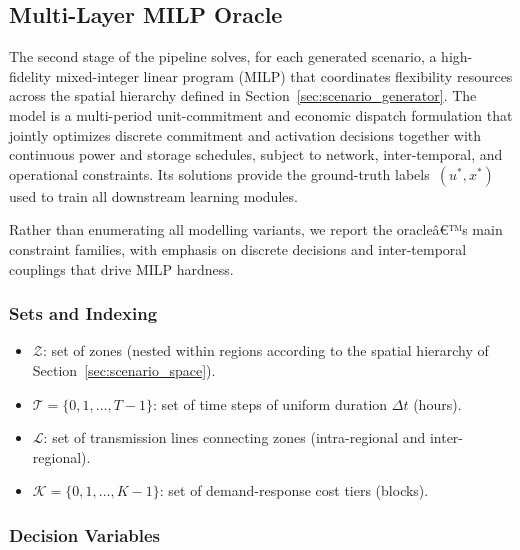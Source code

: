 \documentclass{article}
\begin{document}

\subsection{Multi-Layer MILP Oracle}
\label{sec:milp_oracle}

The second stage of the pipeline solves, for each generated scenario, a high-fidelity mixed-integer linear program (MILP) that coordinates flexibility resources across the spatial hierarchy defined in Section~\ref{sec:scenario_generator}. The model is a multi-period unit-commitment and economic dispatch formulation that jointly optimizes discrete commitment and activation decisions together with continuous power and storage schedules, subject to network, inter-temporal, and operational constraints. Its solutions provide the ground-truth labels~$(u^*, x^*)$ used to train all downstream learning modules.

Rather than enumerating all modelling variants, we report the oracleâ€™s main constraint families,
with emphasis on discrete decisions and inter-temporal couplings that drive MILP hardness.



\subsubsection{Sets and Indexing}
\label{sec:milp_sets}

\begin{itemize}[noitemsep]
  \item $\mathcal{Z}$: set of zones (nested within regions according to the spatial hierarchy of Section~\ref{sec:scenario_space}).
  \item $\mathcal{T} = \{0, 1, \dots, T{-}1\}$: set of time steps of uniform duration $\Delta t$ (hours).
  \item $\mathcal{L}$: set of transmission lines connecting zones (intra-regional and inter-regional).
  \item $\mathcal{K} = \{0, 1, \dots, K{-}1\}$: set of demand-response cost tiers (blocks).
\end{itemize}

\subsubsection{Decision Variables}
\label{sec:milp_variables}
\end{document}

